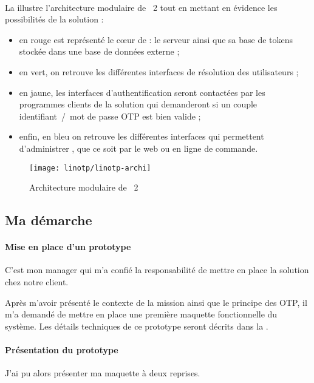 \paragraph{}
La  illustre l'architecture modulaire de \alinotp{}~2 tout en mettant en évidence les possibilités de la solution :

\begin{itemize}
	\item en rouge est représenté le c\oe ur de \alinotp{} : le serveur ainsi que sa base de tokens stockée dans une base de données externe ;
	\item en vert, on retrouve les différentes interfaces de résolution des utilisateurs ;
	\item en jaune, les interfaces d'authentification seront contactées par les programmes clients de la solution qui demanderont si un couple identifiant~/~mot de passe OTP est bien valide ;
	\item enfin, en bleu on retrouve les différentes interfaces qui permettent d'administrer \alinotp{}, que ce soit par le web ou en ligne de commande.
\end{itemize}

\begin{figure}
	\centering
	\texttt{[image: linotp/linotp-archi]}
	\caption{Architecture modulaire de \alinotp{}~2}
	\label{figure:linotp:linotp-archi}
\end{figure}


\subsection{Ma démarche}

\paragraph{Mise en place d'un prototype}
C'est mon manager \apakou{} qui m'a confié la responsabilité de mettre en place la solution \alinotp{} chez notre client.

Après m'avoir présenté le contexte de la mission ainsi que le principe des OTP, il m'a demandé de mettre en place une première maquette fonctionnelle du système.
Les détails techniques de ce prototype seront décrits dans la .

\paragraph{Présentation du prototype}
J'ai pu alors présenter ma maquette à deux reprises.

